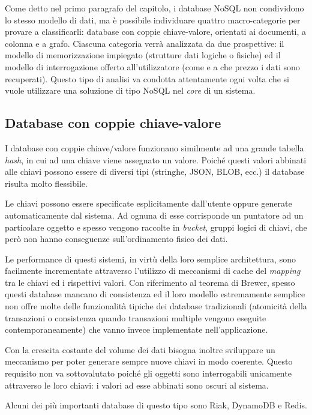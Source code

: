 Come detto nel primo paragrafo del capitolo, i database NoSQL non condividono lo stesso modello di dati, ma è possibile individuare quattro macro-categorie per provare a 
classificarli: database con coppie chiave-valore, orientati ai documenti, a colonna e a grafo. Ciascuna categoria verrà analizzata da due prospettive: il modello di memorizzazione 
impiegato (strutture dati logiche o fisiche) ed il modello di interrogazione offerto all’utilizzatore (come e a che prezzo i dati sono recuperati). Questo tipo di analisi va 
condotta attentamente ogni volta che si vuole utilizzare una soluzione di tipo NoSQL nel \textit{core} di un sistema.


\subsection{Database con coppie chiave-valore}

I database con coppie chiave/valore funzionano similmente ad una grande tabella \textit{hash}, in cui ad una chiave viene assegnato un valore. Poiché questi valori abbinati alle chiavi 
possono essere di diversi tipi (stringhe, JSON, BLOB, ecc.) il database risulta molto flessibile. 

Le chiavi possono essere specificate esplicitamente dall’utente oppure generate automaticamente dal sistema. Ad ognuna di esse corrisponde un puntatore ad un particolare oggetto e
spesso vengono raccolte in \textit{bucket}, gruppi logici di chiavi, che però non hanno conseguenze sull’ordinamento fisico dei dati. 

Le performance di questi sistemi, in virtù della loro semplice architettura, sono facilmente incrementate attraverso l’utilizzo di meccanismi di cache del \textit{mapping} tra le chiavi 
ed i rispettivi valori. Con riferimento al teorema di Brewer, spesso questi database mancano di consistenza ed il loro modello estremamente semplice non offre molte delle funzionalità 
tipiche dei database tradizionali (atomicità della transazioni o consistenza quando transazioni multiple vengono eseguite contemporaneamente) che vanno invece implementate nell’applicazione.

Con la crescita costante del volume dei dati bisogna inoltre sviluppare un meccanismo per poter generare sempre nuove chiavi in modo coerente. Questo requisito non va sottovalutato 
poiché gli oggetti sono interrogabili unicamente attraverso le loro chiavi: i valori ad esse abbinati sono oscuri al sistema.

Alcuni dei più importanti database di questo tipo sono Riak, DynamoDB e Redis.

